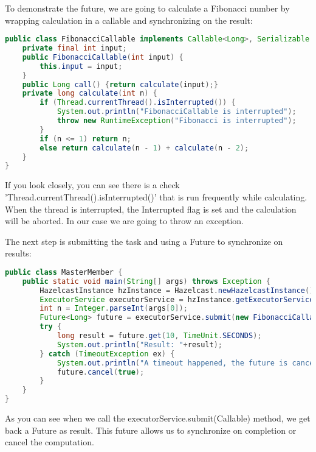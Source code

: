 To demonstrate the future, we are going to calculate a Fibonacci number by wrapping calculation in a callable and synchronizing on the result:
\begin{lstlisting}[language=java]
public class FibonacciCallable implements Callable<Long>, Serializable {
    private final int input;
    public FibonacciCallable(int input) {
        this.input = input;
    }
    public Long call() {return calculate(input);}
    private long calculate(int n) {
        if (Thread.currentThread().isInterrupted()) {
            System.out.println("FibonacciCallable is interrupted");
            throw new RuntimeException("Fibonacci is interrupted");
        }
        if (n <= 1) return n;
        else return calculate(n - 1) + calculate(n - 2);
    }
}
\end{lstlisting}
If you look closely, you can see there is a check 'Thread.currentThread().isInterrupted()' that is run frequently while calculating. When the thread is interrupted, the Interrupted flag is set and the calculation will be aborted. In our case we are going to throw an exception.

The next step is submitting the task and using a Future to synchronize on results:
\begin{lstlisting}[language=java]
public class MasterMember {
    public static void main(String[] args) throws Exception {
        HazelcastInstance hzInstance = Hazelcast.newHazelcastInstance();
        ExecutorService executorService = hzInstance.getExecutorService("executor");
        int n = Integer.parseInt(args[0]);
        Future<Long> future = executorService.submit(new FibonacciCallable(n));
        try {
            long result = future.get(10, TimeUnit.SECONDS);
            System.out.println("Result: "+result);
        } catch (TimeoutException ex) {
            System.out.println("A timeout happened, the future is cancelled");
            future.cancel(true);
        }
    }
}
\end{lstlisting}
As you can see when we call the executorService.submit(Callable) method, we get back a Future as result. This future allows us to synchronize on completion or cancel the computation. 

